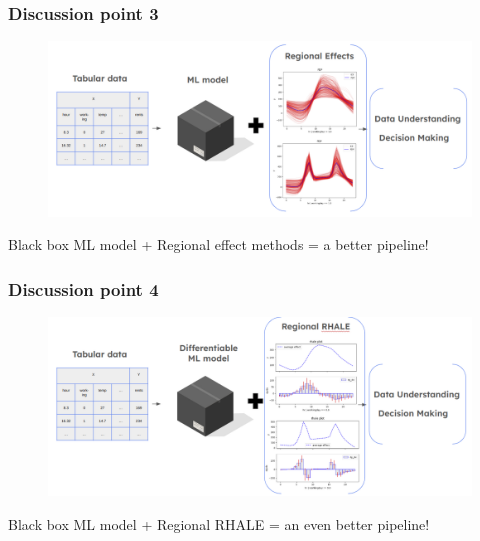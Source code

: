 \documentclass{beamer}
\begin{document}
\begin{frame}
  \frametitle{Discussion point 3}
  \begin{figure}[ht]
    \centering
    \includegraphics[width=\textwidth]{./figures/convincing_point_3.png}
  \end{figure}
  \noindent\makebox[\linewidth]{\rule{\paperwidth}{0.4pt}}
  Black box ML model + Regional effect methods = a better pipeline!
\end{frame}

\begin{frame}
  \frametitle{Discussion point 4}
  \begin{figure}[ht]
    \centering
    \includegraphics[width=\textwidth]{./figures/convincing_point_4.png}
  \end{figure}
  \noindent\makebox[\linewidth]{\rule{\paperwidth}{0.4pt}}
  Black box ML model + Regional RHALE = an even better pipeline!
\end{frame}

\end{document}
